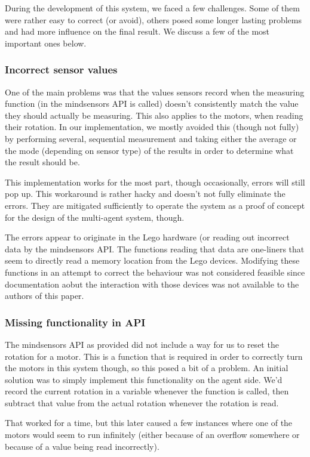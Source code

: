 \documentclass[conference]{IEEEtran}
\begin{document}
During the development of this system, we faced a few challenges. Some of them were rather easy to correct (or avoid), others posed some longer lasting problems and had more influence on the final result. We discuss a few of the most important ones below.

\subsubsection{Incorrect sensor values}
One of the main problems was that the values sensors record when the measuring function (in the mindsensors API is called) doesn't consistently match the value they should actually be measuring. This also applies to the motors, when reading their rotation. In our implementation, we mostly avoided this (though not fully) by performing several, sequential measurement and taking either the average or the mode (depending on sensor type) of the results in order to determine what the result should be. 

This implementation works for the most part, though occasionally, errors will still pop up. This workaround is rather hacky and doesn't not fully eliminate the errors. They are mitigated sufficiently to operate the system as a proof of concept for the design of the multi-agent system, though. 

The errors appear to originate in the Lego hardware (or reading out incorrect data by the mindsensors API. The functions reading that data are one-liners that seem to directly read a memory location from the Lego devices. Modifying these functions in an attempt to correct the behaviour was not considered feasible since documentation aobut the interaction with those devices was not available to the authors of this paper. 

\subsubsection{Missing functionality in API}
The mindsensors API as provided did not include a way for us to reset the rotation for a motor. This is a function that is required in order to correctly turn the motors in this system though, so this posed a bit of a problem. An initial solution was to simply implement this functionality on the agent side. We'd record the current rotation in a variable whenever the function is called, then subtract that value from the actual rotation whenever the rotation is read.

That worked for a time, but this later caused a few instances where one of the motors would seem to run infinitely (either because of an overflow somewhere or because of a value being read incorrectly). 
\end{document}
